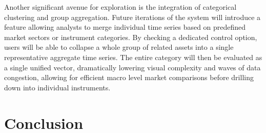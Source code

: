 \documentclass[final,3p,times,twocolumn]{elsarticle}
\begin{document}
Another significant avenue for exploration is the integration of categorical clustering and group aggregation. Future iterations of the system will introduce a feature allowing analysts to merge individual time series based on predefined market sectors or instrument categories. By checking a dedicated control option, users will be able to collapse a whole group of related assets into a single representative aggregate time series. The entire category will then be evaluated as a single unified vector, dramatically lowering visual complexity and waves of data congestion, allowing for efficient macro level market comparisons before drilling down into individual instruments.

\section{Conclusion}\label{sec:conclusion}
\end{document}
